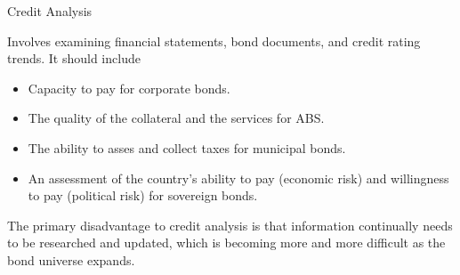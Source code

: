 \documentclass[../custom]{flashcards}
\begin{document}
\begin{flashcard}{Credit Analysis}
    \begin{flushleft}
        Involves examining financial statements, bond documents, and credit rating trends. It should include
        \begin{itemize}
            \item Capacity to pay for corporate bonds.
            \item The quality of the collateral and the services for ABS.
            \item The ability to asses and collect taxes for municipal bonds.
            \item An assessment of the country's ability to pay (economic risk) and willingness to pay (political risk) for sovereign bonds.
        \end{itemize}
        The primary disadvantage to credit analysis is that information continually needs to be researched and updated, which is becoming more and more difficult as the bond universe expands.
    \end{flushleft}
\end{flashcard}
\end{document}
